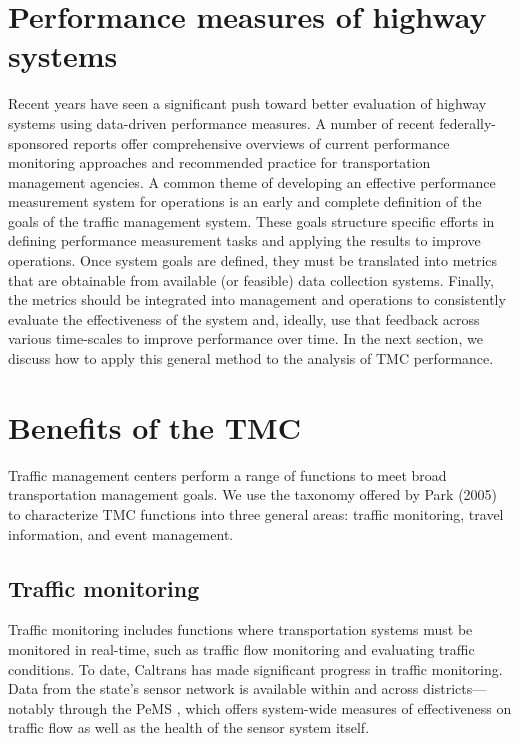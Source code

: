 \documentclass[12pt]{report}
\newcounter{time}
\begin{document}
\section{Performance measures of highway systems}
\label{sec:perf-hw-sys}

Recent years have seen a significant push toward better evaluation of
highway systems using data-driven performance measures. A number of
recent federally-sponsored reports offer comprehensive overviews of
current performance monitoring approaches and recommended practice for
transportation management agencies. A common theme of developing an
effective performance measurement system for operations is an early
and complete definition of the goals of the traffic management
system. These goals structure specific efforts in defining performance
measurement tasks and applying the results to improve operations. Once
system goals are defined, they must be translated into metrics that
are obtainable from available (or feasible) data collection systems.
Finally, the metrics should be integrated into management and
operations to consistently evaluate the effectiveness of the system
and, ideally, use that feedback across various time-scales to improve
performance over time. In the next section, we discuss how to apply
this general method to the analysis of \ac{TMC} performance.

\section{Benefits of the TMC}
\label{sec:tmc-bene}

Traffic management centers perform a range of functions to meet broad
transportation management goals. We use the taxonomy offered by Park
(2005) to characterize \ac{TMC} functions into three general areas: traffic
monitoring, travel information, and event management.

\subsection{Traffic monitoring}
\label{sec:traf-mon}

Traffic monitoring includes functions where transportation systems
must be monitored in real-time, such as traffic flow monitoring and
evaluating traffic conditions. To date, Caltrans has made significant
progress in traffic monitoring. Data from the state's sensor network
is available within and across districts---notably through the
\acf{PeMS} \citep{choe02:_freew_perfor_measur_system_pems}, which
offers system-wide measures of effectiveness on traffic flow as well
as the health of the sensor system itself.
\end{document}
